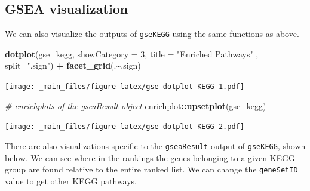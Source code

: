 \documentclass[
]{book}
\newenvironment{Shaded}{\begin{snugshade}}{\end{snugshade}}
\newcommand{\AttributeTok}[1]{\textcolor[rgb]{0.13,0.29,0.53}{#1}}
\newcommand{\CommentTok}[1]{\textcolor[rgb]{0.56,0.35,0.01}{\textit{#1}}}
\newcommand{\DecValTok}[1]{\textcolor[rgb]{0.00,0.00,0.81}{#1}}
\newcommand{\FunctionTok}[1]{\textcolor[rgb]{0.13,0.29,0.53}{\textbf{#1}}}
\newcommand{\NormalTok}[1]{#1}
\newcommand{\SpecialCharTok}[1]{\textcolor[rgb]{0.81,0.36,0.00}{\textbf{#1}}}
\newcommand{\StringTok}[1]{\textcolor[rgb]{0.31,0.60,0.02}{#1}}
\begin{document}
\hypertarget{gsea-visualization}{%
\subsection{GSEA visualization}\label{gsea-visualization}}

We can also visualize the outputs of \texttt{gseKEGG} using the same functions as above.

\begin{Shaded}
\begin{Highlighting}[]
\FunctionTok{dotplot}\NormalTok{(gse\_kegg, }\AttributeTok{showCategory =} \DecValTok{3}\NormalTok{, }\AttributeTok{title =} \StringTok{"Enriched Pathways"}\NormalTok{ , }\AttributeTok{split=}\StringTok{".sign"}\NormalTok{) }\SpecialCharTok{+} \FunctionTok{facet\_grid}\NormalTok{(.}\SpecialCharTok{\textasciitilde{}}\NormalTok{.sign)}
\end{Highlighting}
\end{Shaded}

\texttt{[image: \_main\_files/figure-latex/gse-dotplot-KEGG-1.pdf]}

\begin{Shaded}
\begin{Highlighting}[]
\CommentTok{\# enrichplots of the gseaResult object}
\NormalTok{enrichplot}\SpecialCharTok{::}\FunctionTok{upsetplot}\NormalTok{(gse\_kegg)}
\end{Highlighting}
\end{Shaded}

\texttt{[image: \_main\_files/figure-latex/gse-dotplot-KEGG-2.pdf]}

There are also visualizations specific to the \texttt{gseaResult} output of \texttt{gseKEGG}, shown below. We can see where in the rankings the genes belonging to a given KEGG group are found relative to the entire ranked list. We can change the \texttt{geneSetID} value to get other KEGG pathways.

\begin{Shaded}
\end{Shaded}
\end{document}
